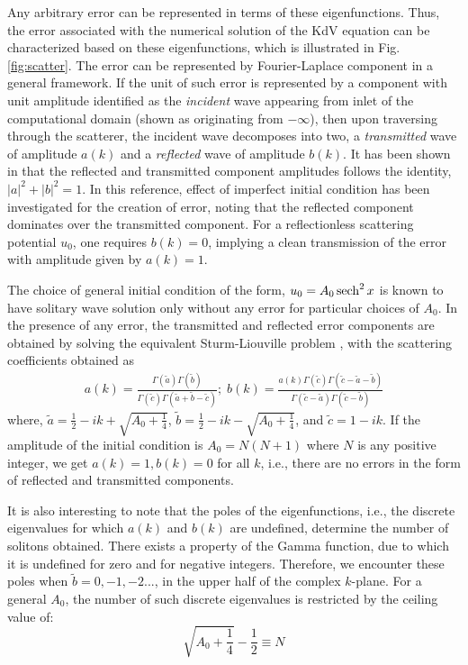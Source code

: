Any arbitrary error can be represented in terms of these eigenfunctions. Thus, the error associated with the numerical solution of the KdV equation 
can be characterized based on these eigenfunctions, which is illustrated in Fig. \ref{fig:scatter}. The error can be represented by Fourier-Laplace component in a general framework. If the unit of such error is represented by a component with unit amplitude identified as the \emph{incident} wave appearing from inlet of the computational domain (shown as originating from $-\infty$), then upon traversing through the scatterer, the incident wave decomposes into two, a \emph{transmitted} wave of amplitude $a(k)$ and a \emph{reflected} wave of amplitude $b(k)$. It has been shown in \cite{Drazin1989} that the reflected and transmitted component amplitudes follows the identity, $|a|^2 + |b|^2 =1$. In this reference, effect of imperfect initial condition has been investigated for the creation of error, noting that the reflected component dominates over the transmitted component. For a reflectionless scattering potential $u_0$, one requires $b(k)=0$, implying a clean transmission of the error with amplitude given by $a(k) = 1$.

The choice of general initial condition of the form, $u_0 = A_0 \operatorname{sech}^2{x}$ is known to have solitary wave solution only without any error for particular choices of $A_0$. In the presence of any error, the transmitted and reflected error components are obtained by solving the equivalent Sturm-Liouville problem \cite[pp. 42-48]{Drazin1989}, with the scattering coefficients obtained as
\begin{align*}
a(k) = \frac{ \Gamma(\tilde{a})\Gamma(\tilde{b}) }{ \Gamma(\tilde{c})\Gamma(\tilde{a}+ \tilde{b} -\tilde{c}) };  \; 
b(k) =\frac{  a(k) \Gamma(\tilde{c})\Gamma(\tilde{c}- \tilde{a} -\tilde{b}) } { \Gamma(\tilde{c} -\tilde{a})\Gamma(\tilde{c} - \tilde{b}) }
\end{align*}
where, $\tilde{a} = \frac{1}{2} - ik + \sqrt{A_0 + \frac{1}{4}}$, $\tilde{b} = \frac{1}{2} - ik - \sqrt{A_0 + \frac{1}{4}}$, and $\tilde{c} = 1 - ik$. If the amplitude of the initial condition is $A_0= N(N+1)$ where $N$ is any positive integer, we get $a(k)=1, b(k)=0$ for all $k$, i.e., there are no errors in the form of reflected and transmitted components.

It is also interesting to note that the poles of the eigenfunctions, i.e., the discrete eigenvalues for which $a(k)$ and $b(k)$ are undefined, determine the number of solitons obtained. There exists a property of the Gamma function, due to which it is undefined for zero and for negative integers. 
Therefore, we encounter these poles when $\tilde{b}=0,-1,-2...$, in the upper half of the complex $k$-plane. For a general $A_0$, the number of such discrete eigenvalues is restricted by the ceiling value of:
\begin{equation}
\label{eq:ao_n_relation}
\sqrt{A_0 + \frac{1}{4}} - \frac{1}{2} \equiv N
\end{equation}

